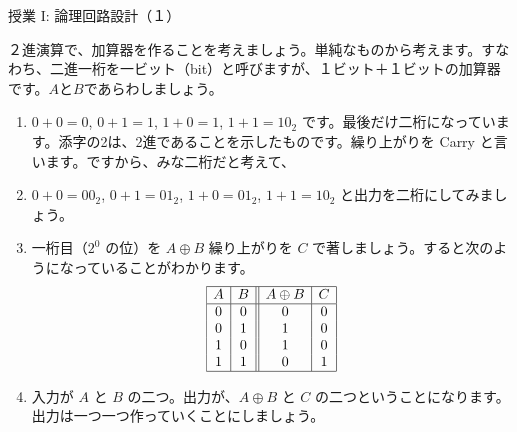 \documentclass[10pt, dvipdfmx]{beamer}
\begin{document}
\begin{frame}{授業 I: 論理回路設計（１）}

２進演算で、加算器を作ることを考えましょう。単純なものから考えます。すなわち、二進一桁を一ビット（bit）と呼びますが、１ビット＋１ビットの加算器です。\(A\)と\(B\)であらわしましょう。
 
\begin{enumerate}
\item \(0+0=0\), \(0+1=1\), \(1+0=1\), \(1+1 = 10_2\) です。最後だけ二桁になっています。添字の2は、2進であることを示したものです。繰り上がりを Carry と言います。ですから、みな二桁だと考えて、
\item \(0+0=00_2\), \(0+1=01_2\), \(1+0=01_2\), \(1+1 = 10_2\) と出力を二桁にしてみましょう。
\item 一桁目（\(2^0\) の位）を \(A\oplus B\) 繰り上がりを \(C\) で著しましょう。すると次のようになっていることがわかります。
\[ \begin{array}{|c|c||c|c|} \hline A  & B  & A\oplus B  & C \\ \hline 0  & 0  & 0  & 0 \\ 0  & 1  & 1  & 0 \\ 1  & 0  & 1  & 0 \\ 1  & 1  & 0  & 1\\ \hline \end{array} \]

\item 入力が \(A\) と \(B\) の二つ。出力が、\(A\oplus B\) と \(C\) の二つということになります。出力は一つ一つ作っていくことにしましょう。
\end{enumerate}
\end{frame}
\end{document}
